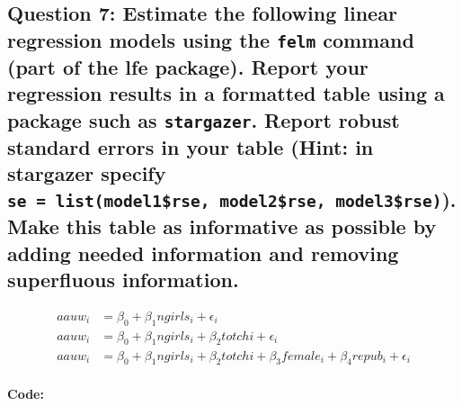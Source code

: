 \documentclass[
]{article}
\begin{document}
\hypertarget{question-7-estimate-the-following-linear-regression-models-using-the-felm-command-part-of-the-lfe-package.-report-your-regression-results-in-a-formatted-table-using-a-package-such-as-stargazer.-report-robust-standard-errors-in-your-table-hint-in-stargazer-specify-se-listmodel1rse-model2rse-model3rse.-make-this-table-as-informative-as-possible-by-adding-needed-information-and-removing-superfluous-information.}{%
\subsection{\texorpdfstring{Question 7: Estimate the following linear
regression models using the \texttt{felm} command (part of the lfe
package). Report your regression results in a formatted table using a
package such as \texttt{stargazer}. Report robust standard errors in
your table (Hint: in stargazer specify
\texttt{se\ =\ list(model1\$rse,\ model2\$rse,\ model3\$rse)}). Make
this table as informative as possible by adding needed information and
removing superfluous
information.}{Question 7: Estimate the following linear regression models using the felm command (part of the lfe package). Report your regression results in a formatted table using a package such as stargazer. Report robust standard errors in your table (Hint: in stargazer specify se = list(model1\$rse, model2\$rse, model3\$rse)). Make this table as informative as possible by adding needed information and removing superfluous information.}}\label{question-7-estimate-the-following-linear-regression-models-using-the-felm-command-part-of-the-lfe-package.-report-your-regression-results-in-a-formatted-table-using-a-package-such-as-stargazer.-report-robust-standard-errors-in-your-table-hint-in-stargazer-specify-se-listmodel1rse-model2rse-model3rse.-make-this-table-as-informative-as-possible-by-adding-needed-information-and-removing-superfluous-information.}}

\[
\begin{aligned}
 aauw_i&=\beta_0+\beta_1ngirls_i+\epsilon_i\\
 aauw_i&=\beta_0+\beta_1ngirls_i+\beta_2totchi+\epsilon_i\\
  aauw_i&=\beta_0+\beta_1ngirls_i+\beta_2totchi+\beta_3female_i+\beta_4repub_i+\epsilon_i\\
\end{aligned}
\]

\textbf{Code:}
\end{document}
